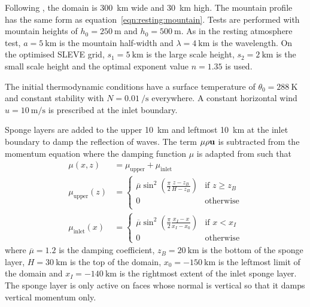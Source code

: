\documentclass[twocol]{ametsoc}
\begin{document}
Following \citet{melvin2010}, the domain is \SI{300}{\kilo\meter} wide and \SI{30}{\kilo\meter} high.  The mountain profile has the same form as equation~\ref{eqn:resting:mountain}.  Tests are performed with mountain heights of $h_0 = \SI{250}{\meter}$ and \(h_0 = \SI{500}{\meter}\).  As in the resting atmosphere test, $a = \SI{5}{\kilo\meter}$ is the mountain half-width and $\lambda = \SI{4}{\kilo\meter}$ is the wavelength.  On the optimised SLEVE grid, $s_1 = \SI{5}{\kilo\meter}$ is the large scale height, $s_2 = \SI{2}{\kilo\meter}$ is the small scale height and the optimal exponent value $n = 1.35$ is used.

The initial thermodynamic conditions have a surface temperature of $\theta_0 = \SI{288}{\kelvin}$ and constant stability with $N = \SI{0.01}{\per\second}$ everywhere.  A constant horizontal wind $u = \SI{10}{\meter\per\second}$ is prescribed at the inlet boundary.

Sponge layers are added to the upper \SI{10}{\kilo\meter} and leftmost \SI{10}{\kilo\meter} at the inlet boundary to damp the reflection of waves.
The term $\mu \rho \bf{u}$ is subtracted from the momentum equation  where the damping function $\mu$ is adapted from \citet{melvin2010} such that
\begin{align}
	\mu(x, z) &= \mu_\mathrm{upper} + \mu_\mathrm{inlet} \\
	\mu_\mathrm{upper}(z) &= \begin{cases}
		\overline{\mu} \sin^2 \left( \frac{\pi}{2} \frac{z - z_B}{H - z_B} \right) & \text{if } z \geq z_B \\
		0 & \text{otherwise} \\
	\end{cases} \\
	\mu_\mathrm{inlet}(x) &= \begin{cases}
		\overline{\mu} \sin^2 \left( \frac{\pi}{2} \frac{x_I - x}{x_I - x_0} \right) & \text{if } x < x_I \\
		0 & \text{otherwise}
	\end{cases}
\end{align}
where $\overline{\mu} = 1.2$ is the damping coefficient, $z_B = \SI{20}{\kilo\meter}$ is the bottom of the sponge layer, $H = \SI{30}{\kilo\meter}$ is the top of the domain, $x_0 = \SI{-150}{\kilo\meter}$ is the leftmost limit of the domain and $x_I = \SI{-140}{\kilo\meter}$ is the rightmost extent of the inlet sponge layer.  The sponge layer is only active on faces whose normal is vertical so that it damps vertical momentum only.
\end{document}
